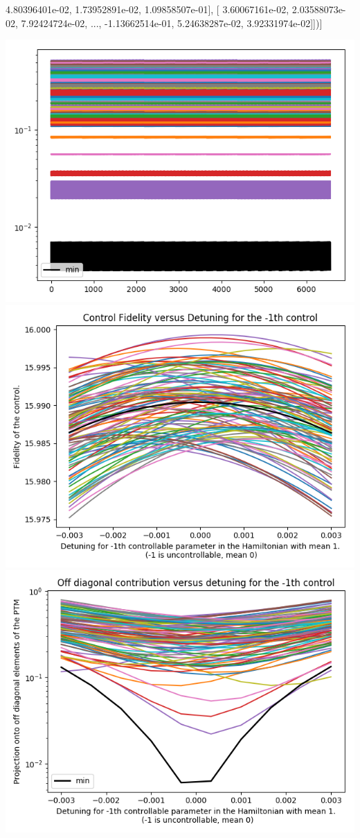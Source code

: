 \documentclass{article}
\begin{document}
          4.80396401e-02,   1.73952891e-02,   1.09858507e-01],
       [  3.60067161e-02,   2.03588073e-02,   7.92424724e-02, ...,
         -1.13662514e-01,   5.24638287e-02,   3.92331974e-02]])]
\begin{center}
\includegraphics[scale=.9]{report_pickled_controlsaws1/control_dpn_all}
\includegraphics[scale=.9]{control_fid_0}
\includegraphics[scale=.9]{off_diag_0}

\end{center}
\end{document}
